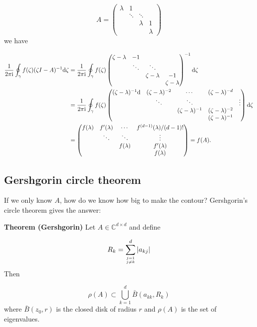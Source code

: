 \documentclass[12pt,a4paper]{article}
\def\D{ {\rm d} }
\def\I{ {\rm i} }
\def\sopmatrix#1{ \begin{pmatrix}#1\end{pmatrix} }
\begin{document}
\[
A =\sopmatrix{\lambda  & 1 \\  
            & \ddots &\ddots \\
            &&\lambda & 1 \\ &&& \lambda}
\]
we have


\begin{align*}
{1 \over 2 \pi \I} \oint_\gamma f(\zeta)(\zeta I - A)^{-1} \D \zeta 
&= 
{1 \over 2 \pi \I} \oint_\gamma f(\zeta) \sopmatrix{\zeta - \lambda  & -1 \\  
            & \ddots &\ddots \\
            &&\zeta - \lambda & -1 \\ &&& \zeta - \lambda}^{-1} \D \zeta \\
&= 
{1 \over 2 \pi \I} \oint_\gamma f(\zeta) \sopmatrix{(\zeta-\lambda)^{-1}\D & (\zeta-\lambda)^{-2} & \cdots & (\zeta-\lambda)^{-d} \\
                                                                    & \ddots& \ddots&  &\vdots \\
                                                                    & & (\zeta-\lambda)^{-1} & (\zeta-\lambda)^{-2} \\
                                                                    &&& (\zeta-\lambda)^{-1}} \D \zeta \\
&= \begin{pmatrix} f(\lambda) & f'(\lambda) & \cdots & f^{(d-1)}(\lambda)/(d-1)! \\
        & \ddots & \ddots & \vdots \\
            & & f(\lambda) & f'(\lambda)\\
            &&& f(\lambda)
            \end{pmatrix} = f(A).
\end{align*}
\subsection{Gershgorin circle theorem}
If we only know $A$, how do we know how big to make the contour? Gershgorin's circle theorem gives the answer:

\textbf{Theorem (Gershgorin)} Let $A \in {\mathbb C}^{d \times d}$ and define 

\[
R_k = \sum_{j=1 \atop j \neq k}^d |a_{kj}| 
\]
Then 

\[
\rho(A) \subset \bigcup_{k=1}^d \bar B(a_{kk}, R_k)
\]
where $\bar B(z_0, r)$ is the closed disk of radius $r$ and $\rho(A)$ is the set of eigenvalues.
\end{document}
